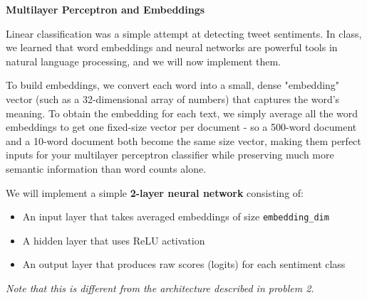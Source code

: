 \item {\bf Multilayer Perceptron and Embeddings}

Linear classification was a simple attempt at detecting tweet sentiments. In class, we learned that word embeddings
and neural networks are powerful tools in natural language processing, and we will now implement them.

To build embeddings, we convert each word into a small,
    dense "embedding" vector (such as a 32-dimensional array of numbers) that captures the word's meaning.
    To obtain the embedding for each text, we simply average all the word embeddings to get one fixed-size vector per document -
    so a 500-word document and a 10-word document both become the same size vector, making them perfect
    inputs for your multilayer perceptron classifier while preserving much more semantic information than word counts alone.

 We will implement a simple \textbf{2-layer neural network} consisting of:
 \begin{itemize}
    \item An input layer that takes averaged embeddings of size \texttt{embedding\_dim}
    \item A hidden layer that uses ReLU activation
    \item An output layer that produces raw scores (logits) for each sentiment class
 \end{itemize}

\textit{Note that this is different from the architecture described in problem 2.}

\begin{enumerate}

  

  

  

  

  

  

\end{enumerate}
